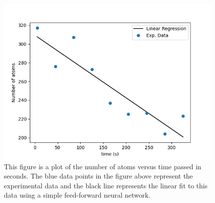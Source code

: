 \begin{figure}[H]
\centering
\includegraphics[scale=0.75]{../figures/decay_data.png}
\caption{This figure is a plot of the number of atoms versus time passed in seconds. The blue data points in the figure above represent the experimental data and the black line represents the linear fit to this data using a simple feed-forward neural network.}
\end{figure}
